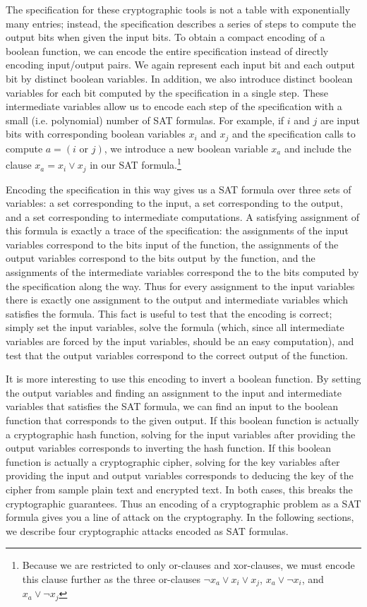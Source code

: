 The specification for these cryptographic tools is not a table with exponentially many entries; instead, the specification describes a series of steps to compute the output bits when given the input bits. To obtain a compact encoding of a boolean function, we can encode the entire specification instead of directly encoding input/output pairs. We again represent each input bit and each output bit by distinct boolean variables. In addition, we also introduce distinct boolean variables for each bit computed by the specification in a single step. These intermediate variables allow us to encode each step of the specification with a small (i.e. polynomial) number of SAT formulas. For example, if $i$ and $j$ are input bits with corresponding boolean variables $x_i$ and $x_j$ and the specification calls to compute $a = (i \text{ or } j)$, we introduce a new boolean variable $x_a$ and include the clause $x_a = x_i \lor x_j$ in our SAT formula.\footnote{Because we are restricted to only or-clauses and xor-clauses, we must encode this clause further as the three or-clauses $\neg x_a \lor x_i \lor x_j$, $x_a \lor \neg x_i$, and $x_a \lor \neg x_j$}

Encoding the specification in this way gives us a SAT formula over three sets of variables: a set corresponding to the input, a set corresponding to the output, and a set corresponding to intermediate computations. A satisfying assignment of this formula is exactly a trace of the specification: the assignments of the input variables correspond to the bits input of the function, the assignments of the output variables correspond to the bits output by the function, and the assignments of the intermediate variables correspond the to the bits computed by the specification along the way. Thus for every assignment to the input variables there is exactly one assignment to the output and intermediate variables which satisfies the formula. This fact is useful to test that the encoding is correct; simply set the input variables, solve the formula (which, since all intermediate variables are forced by the input variables, should be an easy computation), and test that the output variables correspond to the correct output of the function.

It is more interesting to use this encoding to invert a boolean function. By setting the output variables and finding an assignment to the input and intermediate variables that satisfies the SAT formula, we can find an input to the boolean function that corresponds to the given output. If this boolean function is actually a cryptographic hash function, solving for the input variables after providing the output variables corresponds to inverting the hash function.  If this boolean function is actually a cryptographic cipher, solving for the key variables after providing the input and output variables corresponds to deducing the key of the cipher from sample plain text and encrypted text. In both cases, this breaks the cryptographic guarantees. Thus an encoding of a cryptographic problem as a SAT formula gives you a line of attack on the cryptography. In the following sections, we describe four cryptographic attacks encoded as SAT formulas.